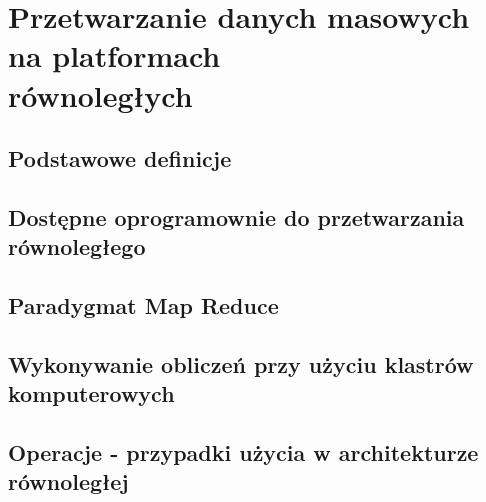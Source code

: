 \chapter{Przetwarzanie danych masowych na platformach\\równoległych} \label{chap.big-data-processing}

\section{Podstawowe definicje}
\section{Dostępne oprogramownie do przetwarzania równoległego}
\section{Paradygmat Map Reduce}
\section{Wykonywanie obliczeń przy użyciu klastrów komputerowych}
\section{Operacje - przypadki użycia w architekturze równoległej}
